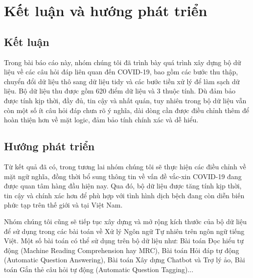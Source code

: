 \documentclass[runningheads]{llncs}
\begin{document}
\section{Kết luận và hướng phát triển}
\subsection{Kết luận}
Trong bài báo cáo này, nhóm chúng tôi đã trình bày quá trình xây dựng bộ dữ liệu về các câu hỏi đáp liên quan đến COVID-19, bao gồm các bước thu thập, chuyển đổi dữ liệu thô sang dữ liệu tidy và các bước tiền xử lý để làm sạch dữ liệu. Bộ dữ liệu thu được gồm 620 điểm dữ liệu và 3 thuộc tính. Dù đảm bảo được tính kịp thời, đầy đủ, tin cậy và nhất quán, tuy nhiên trong bộ dữ liệu vẫn còn một số ít câu hỏi đáp chưa rõ ý nghĩa, dài dòng cần được điều chỉnh thêm để hoàn thiện hơn về mặt logic, đảm bảo tính chính xác và dễ hiểu.

\subsection{Hướng phát triển}
Từ kết quả đã có, trong tương lai nhóm chúng tôi sẽ thực hiện các điều chỉnh về mặt ngữ nghĩa, đồng thời bổ sung thông tin về vấn đề vắc-xin COVID-19 đang được quan tâm hàng đầu hiện nay. Qua đó, bộ dữ liệu được tăng tính kịp thời, tin cậy và chính xác hơn để phù hợp với tình hình dịch bệch đang còn diễn biến phức tạp trên thế giới và tại Việt Nam.

Nhóm chúng tôi cũng sẽ tiếp tục xây dựng và mở rộng kích thước của bộ dữ liệu để sử dụng trong các bài toán về Xử lý Ngôn ngữ Tự nhiên trên ngôn ngữ tiếng Việt. Một số bài toán có thể sử dụng trên bộ dữ liệu như: Bài toán Đọc hiểu tự động (Machine Reading Comprehension hay MRC), Bài toán Hỏi đáp tự động (Automatic Question Answering), Bài toán Xây dựng Chatbot và Trợ lý ảo, Bài toán Gắn thẻ câu hỏi tự động (Automatic Question Tagging)...
 
\end{document}
